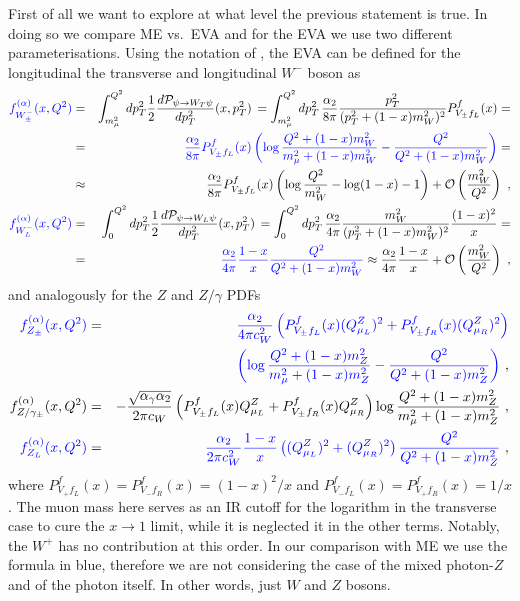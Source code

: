 \documentclass[a4paper,11pt]{article}
\begin{document}
First of all we want to explore at what level the previous statement is true. In doing so we compare  ME vs.~EVA and for the EVA we use two different parameterisations. Using the notation of \cite{Garosi:2023bvq}, the EVA can be defined for the longitudinal the transverse and longitudinal $W^-$ boson as 
\begin{eqnarray}
   { \color{blue} f_{W^-_\pm}^{(\alpha)}(x, Q^2)} &=& \int_{m_\mu^2}^{Q^2} d p_T^2 \frac{1}{2} \frac{d \mathcal{P}_{\psi \to W_T \psi}}{d p_T^2}(x, p_T^2) \, 
    = \int_{m_\mu^2}^{Q^2} d p_T^2 \, \frac{\alpha_2}{8 \pi} \frac{p_T^2}{(p_T^2 + (1-x) m_W^2)^2} P_{V_\pm f_L}^f(x) = \nonumber \\
    &=& { \color{blue}\frac{\alpha_2}{8 \pi} P_{V_\pm f_L}^f(x) \left( \log \frac{Q^2 + (1-x) m_W^2}{m_{\mu}^2 + (1-x) m_W^2} 
    - \frac{Q^2}{Q^2 + (1-x) m_W^2} \right) }= \nonumber \\
    &\approx& \frac{\alpha_2}{8 \pi} P_{V_\pm f_L}^f(x) \left( \log \frac{Q^2}{m_W^2} - \log(1-x) - 1\right) + \mathcal{O}\left( \frac{m_W^2}{Q^2} \right)~, \label{eq:EWA_WT} \\
%
    {\color{blue} f_{W^-_L}^{(\alpha)}(x, Q^2)} &=& \int_{0}^{Q^2} d p_T^2 \frac{1}{2} \frac{d \mathcal{P}_{\psi \to W_L \psi}}{d p_T^2} (x, p_T^2) \, 
    = \int_{0}^{Q^2} d p_T^2 \, \frac{\alpha_2}{4 \pi} \frac{m_W^2}{(p_T^2 + (1-x) m_W^2)^2} \frac{(1-x)^2}{x} = \nonumber \\
    &=& { \color{blue} \frac{\alpha_2}{4 \pi} \frac{1-x}{x}
    \frac{Q^2}{Q^2 + (1-x) m_W^2}}
    \approx \frac{\alpha_2}{4 \pi} \frac{1-x}{x} + \mathcal{O}\left( \frac{m_W^2}{Q^2} \right) ~,\label{eq:EWA_WL}
\end{eqnarray}
and analogously for the $Z$ and $Z/\gamma$ PDFs
\begin{eqnarray}
    {\color{blue}f_{Z_\pm}^{(\alpha)}(x, Q^2)} &=& 
    {\color{blue}\frac{\alpha_2}{4 \pi c_W^2} \left(P_{V_\pm f_L}^f(x) (Q^Z_{\mu_L})^2 + P_{V_\pm f_R}^f(x) (Q^Z_{\mu_R})^2 \right) }\nonumber \\
    && \quad {\color{blue}\left( \log \frac{Q^2 + (1-x) m_Z^2}{m_{\mu}^2 + (1-x) m_Z^2} 
    - \frac{Q^2}{Q^2 + (1-x) m_Z^2} \right)} ~, \label{eq:EWA_ZT} \\
%
    f_{Z/\gamma_\pm}^{(\alpha)}(x, Q^2) &=& 
    -\frac{\sqrt{\alpha_\gamma \alpha_2}}{2 \pi c_W} \left(P_{V_\pm f_L}^f(x) Q^Z_{\mu_L} + P_{V_\pm f_R}^f(x) Q^Z_{\mu_R} \right) \log \frac{Q^2 + (1-x) m_Z^2}{m_{\mu}^2 + (1-x) m_Z^2}  ~, \label{eq:EWA_ZgaT} \\
%
   {\color{blue} f_{Z_L}^{(\alpha)}(x, Q^2)} &=&
    {\color{blue}\frac{\alpha_2}{2 \pi c_W^2} \frac{1-x}{x} \left( (Q^Z_{\mu_L})^2 + (Q^Z_{\mu_R})^2\right) 
    \frac{Q^2}{Q^2 + (1-x) m_Z^2} }~,\label{eq:EWA_ZL}
\end{eqnarray}
where $P_{V_+ f_L}^f(x) = P_{V_- f_R}^f(x) = (1-x)^2 / x$ and $P_{V_- f_L}^f(x) = P_{V_+ f_R}^f(x) = 1 / x$.
The muon mass here serves as an IR cutoff for the logarithm in the transverse case to cure the $x\to 1$ limit, while it is neglected it in the other terms. Notably, the $W^+$ has no contribution at this order.
In our comparison with ME we use the formula in {\color{blue} blue}, therefore we are not considering the case of the mixed photon-$Z$ and of the photon itself.
In other words, just $W$ and $Z$ bosons.
\end{document}
